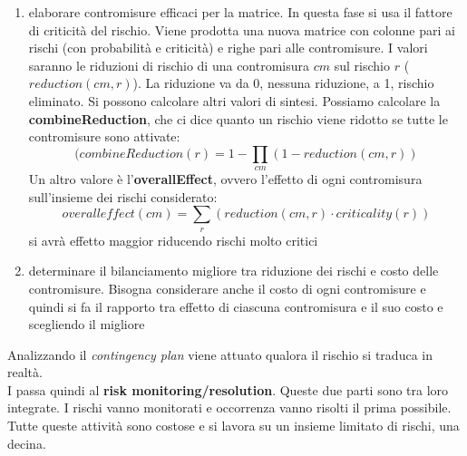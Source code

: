 \documentclass[a4paper,12pt, oneside]{book}
\begin{document}
\begin{enumerate}
\begin{enumerate}
    \item elaborare contromisure efficaci per la matrice. In questa fase si usa
    il fattore di criticità del rischio. Viene prodotta una nuova matrice con
    colonne pari ai rischi (con probabilità e criticità) e righe pari alle
    contromisure. I valori saranno le riduzioni di rischio di una contromisura
    $cm$ sul rischio $r$ ($reduction(cm,r)$). La riduzione va da 0, nessuna
    riduzione, a 1, rischio eliminato. Si possono calcolare altri
    valori di sintesi. Possiamo calcolare la \textbf{combineReduction}, che ci
    dice quanto un rischio viene ridotto se tutte le contromisure sono attivate:
    \[(combineReduction(r)=1-\prod_{cm}(1-reduction(cm, r))\]
    Un altro valore è l'\textbf{overallEffect}, ovvero l'effetto di ogni
    contromisura sull'insieme dei rischi considerato:
    \[overalleffect(cm)=\sum_r(reduction(cm,r)\cdot criticality(r))\]
    si avrà effetto maggior riducendo rischi molto critici
    \item determinare il bilanciamento migliore tra riduzione dei rischi e costo
    delle contromisure. Bisogna considerare anche il costo di ogni contromisure
    e quindi si fa il rapporto tra effetto di ciascuna contromisura e il suo
    costo e scegliendo il migliore
  \end{enumerate}
\end{enumerate}
Analizzando il \textit{contingency plan} viene attuato qualora il rischio si
traduca in realtà.\\
I passa quindi al \textbf{risk monitoring/resolution}. Queste due parti sono tra
loro integrate. I rischi vanno monitorati e occorrenza vanno risolti il prima
possibile. Tutte queste attività sono costose e si lavora su un insieme limitato
di rischi, una decina.
\end{document}
